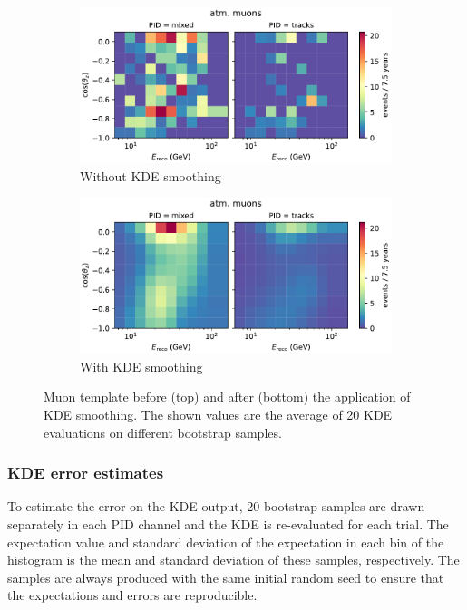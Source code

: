 \begin{figure}[H] 
    \centering
    \begin{subfigure}{0.8\textwidth}
        \centering
        \includegraphics[width=\textwidth,trim={0 0 0 0.6cm},clip]{figures/measurement/systematics/muons/muon_hist_no_kde.pdf}
        \caption{Without KDE smoothing}
        \label{fig:muon-template-no-kde}
    \end{subfigure}
    \begin{subfigure}{0.8\textwidth}
        \centering
        \includegraphics[width=\textwidth,trim={0 0 0 0.6cm},clip]{figures/measurement/systematics/muons/plot_maps_muon.pdf}
        \caption{With KDE smoothing}
        \label{fig:muon-template-with-kde}
    \end{subfigure}
    
    \caption{Muon template before (top) and after (bottom) the application of KDE smoothing. The shown values are the average of 20 KDE evaluations on different bootstrap samples.}
    \label{fig:muon-kde-smoothing}
\end{figure}

\subsubsection{KDE error estimates}
To estimate the error on the KDE output, 20 bootstrap samples are drawn separately in each PID channel and the KDE is re-evaluated for each trial. The expectation value and standard deviation of the expectation in each bin of the histogram is the mean and standard deviation of these samples, respectively. The samples are always produced with the same initial random seed to ensure that the expectations and errors are reproducible.